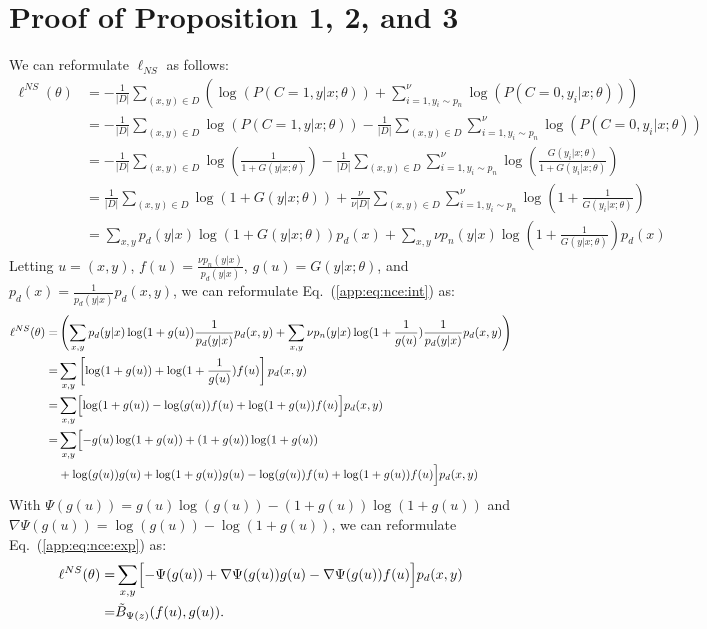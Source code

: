 \onecolumn
\section{Proof of Proposition 1, 2, and 3}
\label{breg:ns:details}
We can reformulate $\ell_{NS}$ as follows:
\begin{align}
    \ell^{NS}(\theta)&=-\frac{1}{|D|}
    \sum_{(x,y) \in D}\left(\log(P(C=1,y|x;\theta))+\sum_{i=1,y_{i}\sim p_n}^{\nu}\log(P(C=0,y_{i}|x;\theta))\right)\nonumber\\
    &=-\frac{1}{|D|}\sum_{(x,y) \in D}\log(P(C=1,y|x;\theta))-\frac{1}{|D|}\sum_{(x,y)\in D}\sum_{i=1,y_{i}\sim p_n}^{\nu}\log(P(C=0,y_{i}|x;\theta))\nonumber\\
    &=-\frac{1}{|D|}\sum_{(x,y) \in D}\log(\frac{1}{1+G(y|x;\theta)})-\frac{1}{ |D|}\sum_{(x,y)\in D}\sum_{i=1,y_{i}\sim p_n}^{\nu}\log(\frac{G(y_{i}|x;\theta)}{1+G(y_{i}|x;\theta)})\nonumber\\
    &=\frac{1}{|D|}\sum_{(x,y)\in D}\log(1+G(y|x;\theta)) + \frac{\nu}{\nu |D|}\sum_{(x,y)\in D}\sum_{i=1,y_{i}\sim p_n}^{\nu}\log(1+\frac{1}{G(y_i|x;\theta)})\nonumber\\
&=\sum_{x,y} p_{d}(y|x)\log(1+G(y|x;\theta))p_{d}(x) + \sum_{x,y} \nu p_{n}(y|x)\log(1+\frac{1}{G(y|x;\theta)})p_{d}(x)\label{app:eq:nce:int}
\end{align}
Letting $u=(x,y)$, $f(u)=\frac{\nu p_{n}(y|x)}{p_{d}(y|x)}$, $g(u)=G(y|x;\theta)$, and $p_{d}(x)=\frac{1}{p_{d}(y|x)}p_{d}(x,y)$, we can reformulate Eq.~(\ref{app:eq:nce:int}) as:
\begin{align}
    \ell^{NS}(\theta)=&\left(\sum_{x,y} p_{d}(y|x)\log(1+g(u))\frac{1}{p_{d}(y|x)}p_{d}(x,y) + \sum_{x,y} \nu p_{n}(y|x)\log(1+\frac{1}{g(u)})\frac{1}{p_{d}(y|x)}p_{d}(x,y)\right)\nonumber\\
    =&\sum_{x,y} \left[\log(1+g(u)) + \log(1+\frac{1}{g(u)})f(u)\right]p_{d}(x,y)\nonumber\\
    =&\sum_{x,y} \Bigl[\log(1+g(u)) - \log(g(u))f(u) + \log(1+g(u))f(u)\Bigr]p_{d}(x,y)\nonumber\\
    =&\sum_{x,y} \Bigl [-g(u)\log(1+g(u)) + (1+g(u))\log(1+g(u))\Bigr.\nonumber\\
    & + \log(g(u))g(u)  + \log(1+g(u))g(u) - \log(g(u))f(u) + \log(1+g(u))f(u)\Bigl.\Bigr]p_{d}(x,y)\label{app:eq:nce:exp}
\end{align}
With $\Psi(g(u))=g(u)\log(g(u))-(1+g(u))\log(1+g(u))$ and $\nabla\Psi(g(u))=\log(g(u))-\log(1+g(u))$, we can reformulate Eq.~(\ref{app:eq:nce:exp}) as:
\begin{align}
    \ell^{NS}(\theta)=& \sum_{x,y}\Bigl[-\Psi(g(u))+\nabla\Psi(g(u))g(u)-\nabla\Psi(g(u))f(u)\Bigr]p_{d}(x,y)\nonumber\\
    =& \tilde{B}_{\Psi(z)}(f(u),g(u)).
    \label{app:eq:ns:breg}
\end{align}
